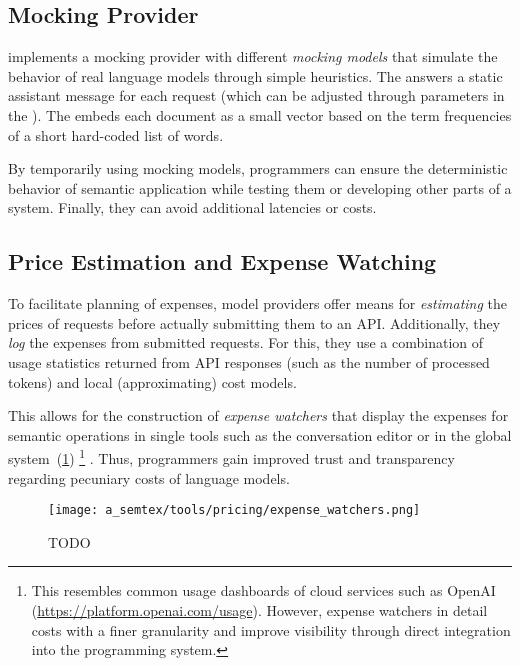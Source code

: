 \subsection{Mocking Provider}
\label{sec:semtex/tools/mocking}

\semtex implements a mocking provider with different \emph{mocking models} that simulate the behavior of real language models through simple heuristics.
The  answers a static assistant message for each request (which can be adjusted through parameters in the ).
The  embeds each document as a small vector based on the term frequencies of a short hard-coded list of words.

By temporarily using mocking models, programmers can ensure the deterministic behavior of semantic application while testing them or developing other parts of a system.
Finally, they can avoid additional latencies or costs.

\subsection{Price Estimation and Expense Watching}
\label{sec:semtex/tools/pricing}

To facilitate planning of expenses, model providers offer means for \emph{estimating} the prices of requests before actually submitting them to an API.
Additionally, they \emph{log} the expenses from submitted requests.
For this, they use a combination of usage statistics returned from API responses (such as the number of processed tokens) and local (approximating) cost models.

This allows for the construction of \emph{expense watchers} that display the expenses for semantic operations in single tools such as the conversation editor or in the global system~(\cref{fig:semtex/tools/pricing/expense_watchers})%
\footnote{%
	This resembles common usage dashboards of cloud services such as OpenAI (\url{https://platform.openai.com/usage}).
	However, expense watchers in \semtex detail costs with a finer granularity and improve visibility through direct integration into the programming system.
}%
.
Thus, programmers gain improved trust and transparency regarding pecuniary costs of language models.

\begin{figure}
	\centering
	\texttt{[image: a\_semtex/tools/pricing/expense\_watchers.png]}
	\caption[TODO]{
		TODO
	}
	\label{fig:semtex/tools/pricing/expense_watchers}
\end{figure}
